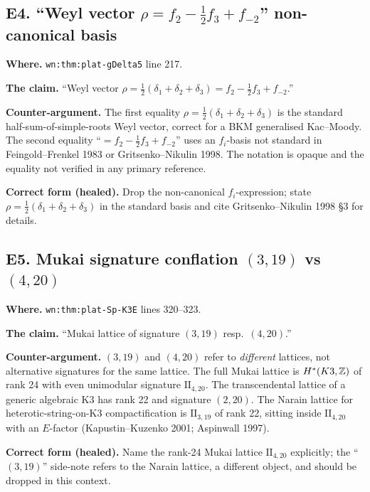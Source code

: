 \subsection*{E4. ``Weyl vector $\rho = f_2 - \tfrac{1}{2} f_3 + f_{-2}$''
non-canonical basis}
\label{wn:subsec:E4-weyl-vector-basis}

\textbf{Where.} \verb|wn:thm:plat-gDelta5| line 217.

\textbf{The claim.} ``Weyl vector
$\rho = \tfrac{1}{2}(\delta_1 + \delta_2 + \delta_3) = f_2 - \tfrac{1}{2} f_3 + f_{-2}$.''

\textbf{Counter-argument.} The first equality
$\rho = \tfrac{1}{2}(\delta_1 + \delta_2 + \delta_3)$ is the standard
half-sum-of-simple-roots Weyl vector, correct for a BKM generalised
Kac--Moody. The second equality ``$= f_2 - \tfrac{1}{2} f_3 + f_{-2}$''
uses an $f_i$-basis not standard in Feingold--Frenkel 1983 or
Gritsenko--Nikulin 1998. The notation is opaque and the equality not
verified in any primary reference.

\textbf{Correct form (healed).} Drop the non-canonical $f_i$-expression;
state $\rho = \tfrac{1}{2}(\delta_1 + \delta_2 + \delta_3)$ in the
standard basis and cite Gritsenko--Nikulin 1998 \S3 for details.

\subsection*{E5. Mukai signature conflation $(3, 19)$ vs $(4, 20)$}
\label{wn:subsec:E5-mukai-signature}

\textbf{Where.} \verb|wn:thm:plat-Sp-K3E| lines 320--323.

\textbf{The claim.} ``Mukai lattice of signature $(3, 19)$ resp.\
$(4, 20)$.''

\textbf{Counter-argument.} $(3, 19)$ and $(4, 20)$ refer to
\emph{different} lattices, not alternative signatures for the same lattice.
The full Mukai lattice is $H^*(K3, \mathbb{Z})$ of rank 24 with even
unimodular signature $\mathrm{II}_{4, 20}$. The transcendental lattice
of a generic algebraic K3 has rank 22 and signature $(2, 20)$. The
Narain lattice for heterotic-string-on-K3 compactification is
$\mathrm{II}_{3, 19}$ of rank 22, sitting inside
$\mathrm{II}_{4, 20}$ with an $E$-factor (Kapustin--Kuzenko 2001;
Aspinwall 1997).

\textbf{Correct form (healed).} Name the rank-24 Mukai lattice
$\mathrm{II}_{4, 20}$ explicitly; the ``$(3, 19)$'' side-note refers to
the Narain lattice, a different object, and should be dropped in this
context.


